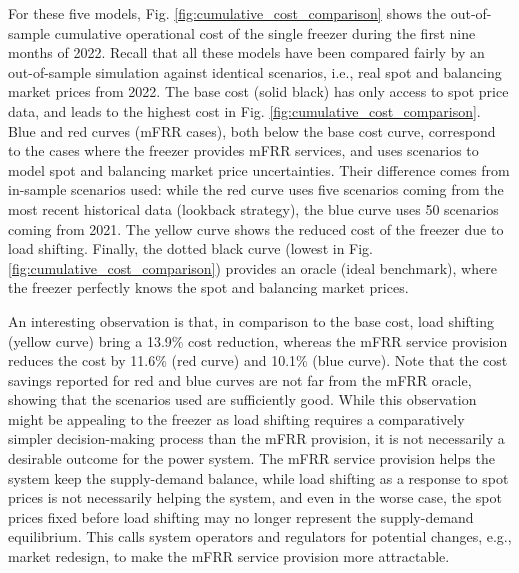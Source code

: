 For these five models, Fig. \ref{fig:cumulative_cost_comparison} shows the out-of-sample cumulative operational cost of the single freezer during the first nine months of 2022. Recall that all these models have been compared fairly by an out-of-sample simulation against identical scenarios, i.e., real spot and balancing market prices from 2022.
The base cost (solid black) has only access to spot price data, and leads to the highest cost in Fig. \ref{fig:cumulative_cost_comparison}.
Blue and red curves (mFRR cases), both below the base cost curve, correspond to the cases where the freezer provides mFRR services, and uses scenarios to model spot and balancing market price uncertainties. Their difference comes from in-sample scenarios used: while the red curve uses five scenarios coming from the most recent historical data (lookback strategy), the blue curve uses 50 scenarios coming from 2021. The yellow curve shows the reduced cost of the freezer due to  load shifting. Finally, the dotted black curve (lowest in Fig. \ref{fig:cumulative_cost_comparison}) provides an oracle (ideal benchmark), where the freezer perfectly knows the spot and balancing market prices.

An interesting observation is that, in comparison to the base cost, load shifting (yellow curve) bring a 13.9\% cost reduction, whereas the mFRR service provision reduces the cost by  11.6\% (red curve) and 10.1\% (blue curve). Note that the cost savings reported for red and blue curves are not far  from the mFRR oracle, showing that the scenarios used are sufficiently good.
While this observation might be appealing to the freezer as load shifting requires a comparatively simpler decision-making process than the mFRR provision, it is not necessarily a desirable outcome for the power system. The mFRR service provision helps the system keep the supply-demand balance, while load shifting as a response to spot prices is not necessarily helping the system, and even in the worse case, the spot prices fixed before load shifting may no longer represent the supply-demand equilibrium. This calls system operators and regulators for potential changes, e.g., market redesign, to make the mFRR service provision more attractable.



